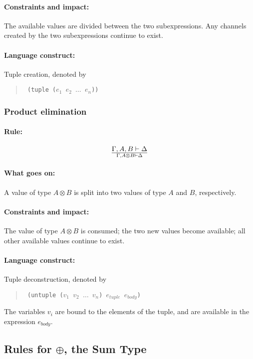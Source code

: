 \documentclass[a4paper]{article}
\begin{document}
\paragraph{Constraints and impact:} The available values are divided
between the two subexpressions.  Any channels created
by the two subexpressions continue to exist.

\paragraph{Language construct:} Tuple creation, denoted by
\begin{quote}\tt
  (tuple ($e_1$ $e_2$ $\ldots$ $e_n$))
\end{quote}

\subsubsection{Product elimination}
\paragraph{Rule:}
$$
{
  \Gamma, A, B \vdash \Delta
}\over{
  \Gamma, A\otimes B \vdash \Delta
}
$$

\paragraph{What goes on:} A value of type $A \otimes B$ is split into two values of type $A$ and $B$, respectively.

\paragraph{Constraints and impact:} The value of type $A \otimes B$ is consumed; the two new values become available; all other available values continue to exist.

\paragraph{Language construct:} Tuple deconstruction, denoted by
\begin{quote}\tt
  (untuple ($v_1$ $v_2$ $\ldots$ $v_n$) $e_{tuple}$ $e_{body}$)
\end{quote}
The variables $v_i$ are bound to the elements of the tuple, and are available in the expression $e_{body}$.



\subsection{Rules for $\oplus$, the Sum Type}
\end{document}

